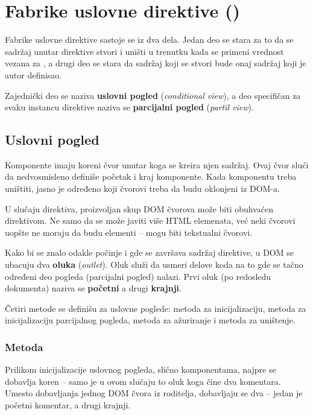 \section{Fabrike uslovne direktive ()}\label{sec:fabrike-uslovne-direktive}

Fabrike uslovne direktive sastoje se iz dva dela.
Jedan deo se stara za to da se sadržaj unutar direktive stvori i uništi u trenutku kada se primeni vrednost vezana za , a drugi deo se stara da sadržaj koji se stvori bude onaj sadržaj koji je autor definisao.

Zajednički deo se naziva \textbf{uslovni pogled} (\textsl{conditional view}), a deo specifičan za svaku instancu direktive naziva se \textbf{parcijalni pogled} (\textsl{partil view}).

\subsection{Uslovni pogled}

Komponente imaju koreni čvor unutar koga se kreira njen sadržaj.
Ovaj čvor slući da nedvosmisleno definiše početak i kraj komponente.
Kada komponentu treba uništiti, jasno je određeno koji čvorovi treba da budu oklonjeni iz DOM-a.

U slučaju direktiva, proizvoljan skup DOM čvorova može biti obuhvaćen direktivom.
Ne samo da se može javiti više HTML elemenata, već neki čvorovi uopšte ne moraju da budu elementi -- mogu biti tekstualni čvorovi.

Kako bi se znalo odakle počinje i gde se završava sadržaj direktive, u DOM se ubacuju dva \textbf{oluka} (\textsl{outlet}).
Oluk služi da usmeri delove koda na to gde se tačno određeni deo pogleda (parcijalni pogled) nalazi.
Prvi oluk (po redosledu dokumenta) naziva se \textbf{početni} a drugi \textbf{krajnji}.

Četiri metode se definišu za uslovne poglede: metoda za inicijalizaciju, metoda za inicijalizaciju parcijalnog pogleda, metoda za ažuriranje i metoda za uništenje.

\subsubsection{Metoda }

Prilikom inicijalizacije uslovnog pogleda, slično komponentama, najpre se dobavlja koren -- samo je u ovom slučaju to oluk koga čine dva komentara.
Umesto dobavljanja jednog DOM čvora iz roditelja, dobavljaju se dva -- jedan je početni komentar, a drugi krajnji.

